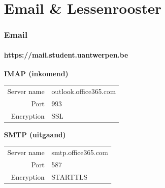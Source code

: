     
\section{Email \& Lessenrooster}
\begin{frame}
	\frametitle{Email}
	\framesubtitle{https://mail.student.uantwerpen.be}
    \begin{center}
    \end{center}
   	\textbf{IMAP (inkomend)}
    \begin{tabularx}{\linewidth}{rX}
      Server name & outlook.office365.com \\
      Port & 993 \\
      Encryption & SSL \\
	\end{tabularx} \vspace{0.5cm}
    
	\textbf{SMTP (uitgaand)}
    \begin{tabularx}{\linewidth}{rX}
      Server name & smtp.office365.com \\
      Port & 587 \\
      Encryption & STARTTLS \\
	\end{tabularx} \vspace{0.5cm}
    
\end{frame}
    
